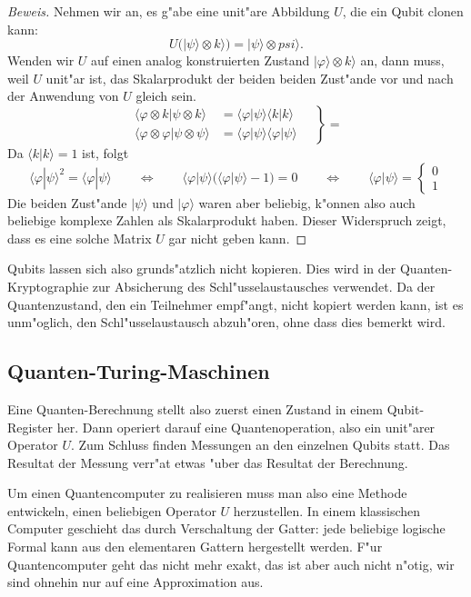 \begin{proof}[Beweis]
Nehmen wir an, es g"abe eine unit"are Abbildung $U$, die ein Qubit clonen
kann:
\[
U(|\psi\rangle\otimes k\rangle)=|\psi\rangle\otimes psi\rangle.
\]
Wenden wir $U$ auf einen analog konstruierten Zustand
$|\varphi\rangle\otimes k\rangle$ an, dann muss, weil $U$ unit"ar ist,
das Skalarprodukt der beiden beiden Zust"ande vor und nach der Anwendung
von $U$ gleich sein.
\begin{equation}
\left.
\begin{aligned}
\langle\varphi\otimes k|\psi\otimes k\rangle
&=
\langle\varphi|\psi\rangle \langle k|k\rangle
\\
\langle\varphi\otimes\varphi|\psi\otimes\psi\rangle
&=
\langle\varphi|\psi\rangle \langle \varphi|\psi\rangle
\end{aligned}
\quad
\right\}=
\end{equation}
Da $\langle k|k\rangle=1$ ist, folgt
\[
\langle \varphi|\psi\rangle^2=
\langle \varphi|\psi\rangle
\qquad\Leftrightarrow\qquad
\langle \varphi|\psi\rangle ( \langle \varphi|\psi\rangle -1) = 0
\qquad\Leftrightarrow\qquad
\langle \varphi|\psi\rangle =\begin{cases}0\\1\end{cases}
\]
Die beiden Zust"ande $|\psi\rangle$ und $|\varphi\rangle$ waren aber
beliebig, k"onnen also auch beliebige komplexe Zahlen als Skalarprodukt
haben.
Dieser Widerspruch zeigt, dass es eine solche Matrix $U$ gar nicht
geben kann.
\end{proof}

Qubits lassen sich also grunds"atzlich nicht kopieren.
Dies wird in der Quanten-Kryptographie zur Absicherung des
Schl"usselaustausches verwendet. 
Da der Quantenzustand, den ein Teilnehmer empf"angt, nicht kopiert
werden kann, ist es unm"oglich, den Schl"usselaustausch abzuh"oren,
ohne dass dies bemerkt wird.

\subsection{Quanten-Turing-Maschinen}
Eine Quanten-Berechnung stellt also zuerst einen Zustand in einem
Qubit-Register her.
Dann operiert darauf eine Quantenoperation, also ein unit"arer Operator $U$.
Zum Schluss finden Messungen an den einzelnen Qubits statt.
Das Resultat der Messung verr"at etwas "uber das Resultat der Berechnung.

Um einen Quantencomputer zu realisieren muss man also eine Methode
entwickeln, einen beliebigen Operator $U$ herzustellen.
In einem klassischen Computer geschieht das durch Verschaltung der
Gatter: jede beliebige logische Formal kann aus den elementaren
Gattern hergestellt werden.
F"ur Quantencomputer geht das nicht mehr exakt, das ist aber auch nicht
n"otig, wir sind ohnehin nur auf eine Approximation aus.

